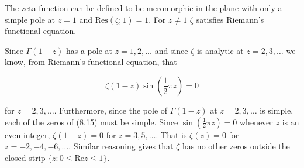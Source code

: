 The zeta function can be defined to be meromorphic in the plane with only a simple pole at $z = 1$ and $\text{Res}(\zeta; 1) = 1$. For $z \neq 1$ $\zeta$ satisfies Riemann's functional equation.

Since $\Gamma(1-z)$ has a pole at $z = 1, 2, \ldots$ and since $\zeta$ is analytic at $z = 2, 3, \ldots$ we know, from Riemann's functional equation, that

$$\zeta(1-z) \sin \left(\frac{1}{2} \pi z\right) = 0$$

for $z = 2, 3, \ldots$. Furthermore, since the pole of $\Gamma(1-z)$ at $z = 2, 3, \ldots$ is simple, each of the zeros of (8.15) must be simple. Since $\sin \left(\frac{1}{2} \pi z\right) = 0$ whenever $z$ is an even integer, $\zeta(1-z) = 0$ for $z = 3, 5, \ldots$. That is $\zeta(z) = 0$ for $z = -2, -4, -6, \ldots$. Similar reasoning gives that $\zeta$ has no other zeros outside the closed strip $\{z: 0 \leq \text{Re} z \leq 1\}$.